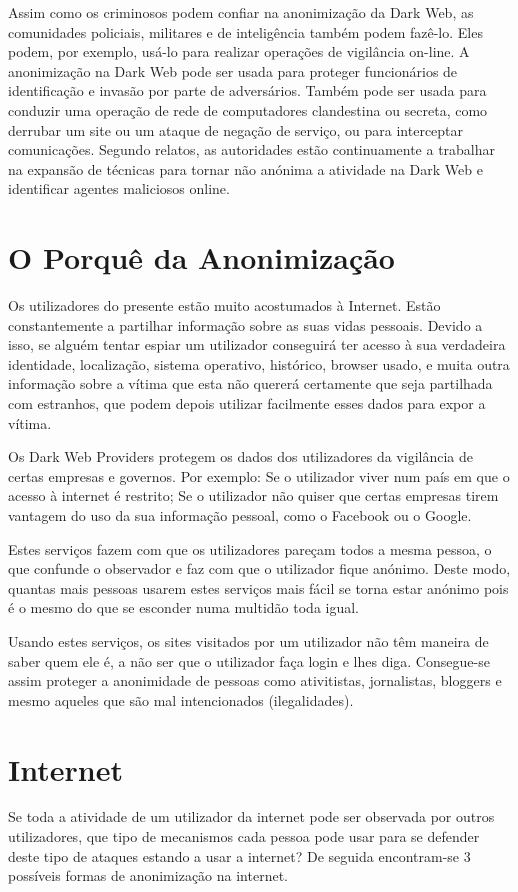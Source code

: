 \documentclass{llncs}
\begin{document}
Assim como os criminosos podem confiar na anonimização da Dark Web, as comunidades policiais, militares e de inteligência também podem fazê-lo. Eles podem, por exemplo, usá-lo para realizar operações de vigilância on-line. A anonimização na Dark Web pode ser usada para proteger funcionários de identificação e invasão por parte de adversários. Também pode ser usada para conduzir uma operação de rede de computadores clandestina ou secreta, como derrubar um site ou um ataque de negação de serviço, ou para interceptar comunicações. Segundo relatos, as autoridades estão continuamente a trabalhar na expansão de técnicas para tornar não anónima a atividade na Dark Web e identificar agentes maliciosos online. \cite{R44101}


\section{O Porquê da Anonimização}
Os utilizadores do presente estão muito acostumados à Internet. Estão constantemente a partilhar informação sobre as suas vidas pessoais. Devido a isso, se alguém tentar espiar um utilizador conseguirá ter acesso à sua verdadeira identidade, localização, sistema operativo, histórico, browser usado, e muita outra informação sobre a vítima que esta não quererá certamente que seja partilhada com estranhos, que podem depois utilizar facilmente esses dados para expor a vítima.

Os Dark Web Providers protegem os dados dos utilizadores da vigilância de certas empresas e governos. Por exemplo:
	Se o utilizador viver num país em que o acesso à internet é restrito;
	Se o utilizador não quiser que certas empresas tirem vantagem do uso da sua informação pessoal, como o Facebook ou o Google.

Estes serviços fazem com que os utilizadores pareçam todos a mesma pessoa, o que confunde o observador e faz com que o utilizador fique anónimo. Deste modo, quantas mais pessoas usarem estes serviços mais fácil se torna estar anónimo pois é o mesmo do que se esconder numa multidão toda igual.

Usando estes serviços, os sites visitados por um utilizador não têm maneira de saber quem ele é, a não ser que o utilizador faça login e lhes diga. Consegue-se assim proteger a anonimidade de pessoas como ativitistas, jornalistas, bloggers e mesmo aqueles que são mal intencionados (ilegalidades). \cite{toryoutube}

\section{Internet}
Se toda a atividade de um utilizador da internet pode ser observada por outros utilizadores, que tipo de mecanismos cada pessoa pode usar para se defender deste tipo de ataques estando a usar a internet? De seguida encontram-se 3 possíveis formas de anonimização na internet.
\end{document}
